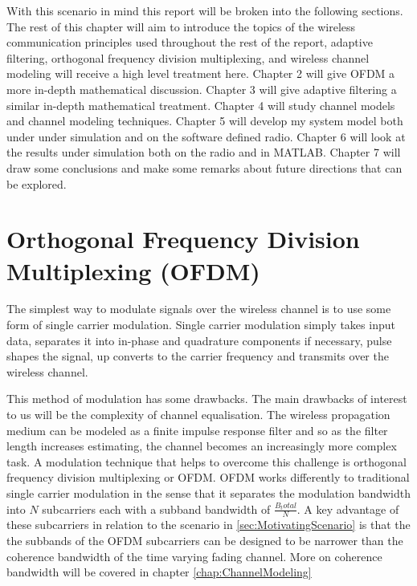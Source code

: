 With this scenario in mind this report will be broken %
into the following sections. The rest of this chapter %
will aim to introduce the topics of the wireless %
communication principles used throughout the rest %
of the report, adaptive filtering, orthogonal %
frequency division multiplexing, and wireless %
channel modeling will receive a high level treatment %
here. Chapter 2 will give OFDM a more in-depth %
mathematical discussion. %
Chapter 3 will give adaptive filtering a similar %
in-depth mathematical treatment. Chapter 4 will study %
channel models and channel modeling techniques. %
Chapter 5 will develop my system model both under %
under simulation and on the software defined radio. %
Chapter 6 will look at the results under simulation %
both on the radio and in MATLAB. Chapter 7 will draw %
some conclusions and make some remarks about future %
directions that can be explored.

\section{Orthogonal Frequency Division Multiplexing %
(OFDM)}

The simplest way to modulate signals over the wireless %
channel is to use some form of single carrier modulation. %
Single carrier modulation simply takes input data, separates %
it into in-phase and quadrature components if necessary, pulse %
shapes the signal, up converts to the carrier frequency and %
transmits over the wireless channel.

This method of modulation has some drawbacks. %
The main drawbacks of interest to us will be the complexity of %
channel equalisation. The wireless propagation medium can be %
modeled as a finite impulse response filter %
and so as the filter length increases estimating, %
the channel becomes an increasingly more complex task. %
A modulation technique that helps to overcome this challenge %
is orthogonal frequency division multiplexing or OFDM. %
OFDM works differently to traditional single carrier %
modulation in the sense that it separates the modulation %
bandwidth into $N$ subcarriers each with a subband bandwidth of %
$\frac{B_total}{N}$. A key advantage of these subcarriers in %
relation to the scenario in \ref{sec:MotivatingScenario} is that %
the the subbands of the OFDM subcarriers can be designed to %
be narrower than the coherence bandwidth of the time %
varying fading channel. More on coherence bandwidth will %
be covered in chapter \ref{chap:ChannelModeling}

